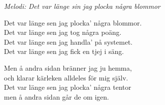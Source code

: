 {\footnotesize\textit{Melodi: Det var länge sin jag plocka några blommor}}\par
\vspace{10pt}
Det var länge sen jag plocka' några blommor.\\
Det var länge sen jag tog några poäng.\\
Det var länge sen jag handla' på systemet.\\
Det var länge sen jag fick en tjej i säng.\par
\vspace{10pt}
Men å andra sidan bränner jag ju hemma,\\
och klarar kärleken alldeles för mig själv.\\
Det var länge sen jag plocka' några tentor\\
men å andra sidan går de om igen.
